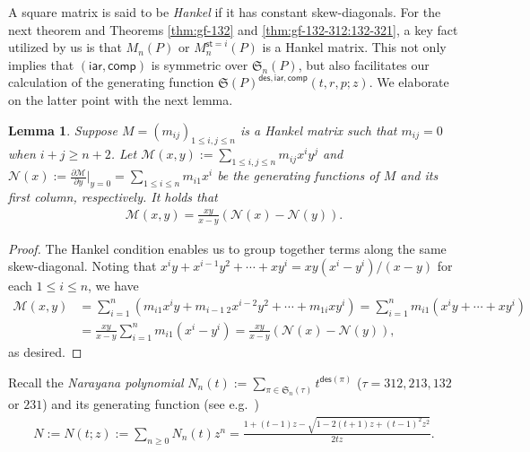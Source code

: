 \documentclass[12pt]{amsart}
\numberwithin{equation}{section}
\theoremstyle{plain}
\newtheorem{lemma}[theorem]{Lemma}
\theoremstyle{definition}
\def\des{\mathsf{des}}
\def\S{\mathfrak{S}}
\def\iar{\mathsf{iar}}
\def\comp{\mathsf{comp}}
\def\st{\mathsf{st}}
\begin{document}
A square matrix is said to be {\em Hankel} if it has constant skew-diagonals. For the next theorem and Theorems \ref{thm:gf-132} and \ref{thm:gf-132-312:132-321}, a key fact utilized by us is that $M_n(P)$ or $M_n^{\st=i}(P)$ is a Hankel matrix. This not only implies that $(\iar,\comp)$ is symmetric over $\S_n(P)$, but also facilitates our calculation of the generating function $\S(P)^{\des,\iar,\comp}(t,r,p;z)$. We elaborate on the latter point with the next lemma. 





\begin{lemma}\label{gf:Hankel}
Suppose $M=(m_{ij})_{1\le i,j\le n}$ is a Hankel matrix such that $m_{ij}=0$ when $i+j\ge n+2$. Let $\mathcal{M}(x,y):=\sum_{1\le i,j\le n}m_{ij}x^iy^j$ and $\mathcal{N}(x):=\frac{\partial \mathcal{M}}{\partial y}|_{y=0}=\sum_{1\le i\le n}m_{i1}x^i$ be the generating functions of $M$ and its first column, respectively. It holds that
\begin{align}
\mathcal{M}(x,y)=\frac{xy}{x-y}(\mathcal{N}(x)-\mathcal{N}(y)).
\end{align}
\end{lemma}
\begin{proof}
The Hankel condition enables us to group together terms along the same skew-diagonal. Noting that $x^iy+x^{i-1}y^2+\cdots+xy^i=xy(x^i-y^i)/(x-y)$ for each $1\le i\le n$, we have
\begin{align*}
\mathcal{M}(x,y) &= \sum_{i=1}^n (m_{i1}x^iy+m_{i-1\:2}x^{i-2}y^2+\cdots+m_{1i}xy^i)=\sum_{i=1}^n m_{i1}(x^iy+\cdots+xy^i)\\
&= \frac{xy}{x-y}\sum_{i=1}^n m_{i1}(x^i-y^i)=\frac{xy}{x-y}(\mathcal{N}(x)-\mathcal{N}(y)),
\end{align*}
as desired.
\end{proof}

Recall the {\em Narayana polynomial} $N_n(t):=\sum_{\pi\in\S_n(\tau)}t^{\des(\pi)}$ ($\tau=312, 213, 132$ or $231$) and its generating function (see e.g.~\cite[Eq.~2.6]{pet})
\begin{align}\label{def:N}
N:=N(t;z):=\sum_{n\ge 0}N_n(t)z^n=\frac{1+(t-1)z-\sqrt{1-2(t+1)z+(t-1)^2z^2}}{2tz}.
\end{align}
 
\end{document}
